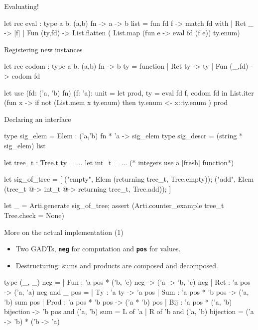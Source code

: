 \documentclass[final,xetex]{beamer}
\newcommand{\green}[1]{{\color{chameleon3}#1}}
\newcommand{\code}[1]{\texttt{\textbf{#1}}}
\begin{document}
\begin{frame}[fragile]{Evaluating!}
\begin{ocamlcode}
let rec eval : type a b. (a,b) fn -> a -> b list =
  fun fd f ->
    match fd with
    | Ret _ -> [f]
    | Fun (ty,fd) -> List.flatten (
        List.map (fun e -> eval fd (f e)) ty.enum)
\end{ocamlcode}
\end{frame}

\begin{frame}[fragile]{Registering new instances}
\begin{ocamlcode}
let rec codom : type a b. (a,b) fn -> b ty =
  function
    | Ret ty -> ty
    | Fun (_,fd) -> codom fd

let use (fd: ('a, 'b) fn) (f: 'a): unit =
  let prod, ty = eval fd f, codom fd in
  List.iter (fun x ->
    if not (List.mem x ty.enum)
    then ty.enum <- x::ty.enum
  ) prod
\end{ocamlcode}

\end{frame}

\begin{frame}[fragile]{Declaring an interface}
\begin{ocamlcode}
type sig_elem = Elem : ('a,'b) fn * 'a -> sig_elem
type sig_descr = (string * sig_elem) list

let tree_t : Tree.t ty  = ...
let int_t = ... (* integers use a [fresh] function*)

let sig_of_tree = [
  ("empty", Elem (returning tree_t, Tree.empty));
  ("add", Elem (tree_t @-> int_t @-> returning tree_t, Tree.add)); ]

let _ =
  Arti.generate sig_of_tree;
  assert (Arti.counter_example tree_t Tree.check = None)
\end{ocamlcode}

\end{frame}

\begin{frame}[fragile]{More on the actual implementation (1)}

  \begin{itemize}
    \item Two GADTs, \code{neg} for computation and \code{pos} for values.
    \item Destructuring: sums and products are \green{composed} and
      \green{decomposed}.
  \end{itemize}

  \begin{ocamlcode}
  type (_, _) neg =
  | Fun : 'a pos * ('b, 'c) neg -> ('a -> 'b, 'c) neg
  | Ret : 'a pos -> ('a, 'a) neg
  and _ pos =
  | Ty : 'a ty -> 'a pos
  | Sum : 'a pos * 'b pos -> ('a, 'b) sum pos
  | Prod : 'a pos  * 'b pos -> ('a * 'b) pos
  | Bij : 'a pos * ('a, 'b) bijection -> 'b pos
  and ('a, 'b) sum = L of 'a | R of 'b
  and ('a, 'b) bijection = ('a -> 'b) * ('b -> 'a)
  \end{ocamlcode}

\end{frame}
\end{document}
